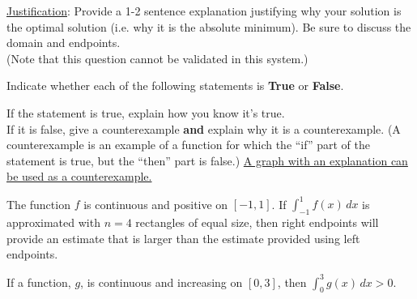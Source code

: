 \documentclass[handout]{ximera}
\begin{document}
\begin{problem}
\begin{question}
\underline{Justification}: Provide a 1-2 sentence explanation justifying why your solution is the optimal solution (i.e. why it is the absolute minimum). Be sure to discuss the domain and endpoints. \\(Note that this question cannot be validated in this system.)
\begin{freeResponse}
\end{freeResponse}
\end{question}

\end{problem}


\begin{problem}
Indicate whether each of the following statements is \textbf{True} or \textbf{False}.
 
If the statement is true, explain how you know it's true.\\
 
If it is false, give a counterexample \textbf{and} explain why it is a counterexample. (A counterexample is an example of a function for which the ``if'' part of the statement is true, but the ``then'' part is false.) \underline{A graph with an explanation can be used as a counterexample.}\\

\begin{question}
The function $f$ is continuous and positive on $[-1,1]$. If $\displaystyle\int_{-1}^1 f(x) \, dx$ is approximated with $n=4$ rectangles of equal size, then right endpoints will provide an estimate that is larger than the estimate provided using left endpoints. 
\begin{multipleChoice}
\end{multipleChoice}
\end{question}

\begin{question}
If a function, $g$, is continuous and increasing on $[0,3]$, then $\displaystyle\int_0^3 g(x)\,dx>0$.
\begin{multipleChoice}
\end{multipleChoice}
\end{question}

\end{problem}
\end{document}
